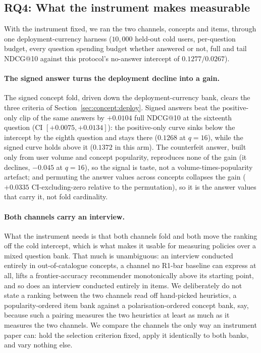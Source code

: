 \documentclass[manuscript,screen]{acmart}
\begin{document}
\subsection{RQ4: What the instrument makes measurable}\label{sec:res:concept}

With the instrument fixed, we ran the two channels, concepts and items, through one deployment-currency harness ($10{,}000$ held-out cold users, per-question budget, every question spending budget whether answered or not, full and tail NDCG@10 against this protocol's no-answer intercept of $0.1277/0.0267$).

\paragraph{The signed answer turns the deployment decline into a gain.} The signed concept fold, driven down the deployment-currency bank, clears the three criteria of Section~\ref{sec:concept:deploy}. Signed answers beat the positive-only clip of the same answers by $+0.0104$ full NDCG@10 at the sixteenth question (CI $[+0.0075,+0.0134]$): the positive-only curve sinks below the intercept by the eighth question and stays there ($0.1268$ at $q{=}16$), while the signed curve holds above it ($0.1372$ in this arm). The counterfeit answer, built only from user volume and concept popularity, reproduces none of the gain (it declines, $-0.045$ at $q{=}16$), so the signal is taste, not a volume-times-popularity artefact; and permuting the answer values across concepts collapses the gain ($+0.0335$ CI-excluding-zero relative to the permutation), so it is the answer values that carry it, not fold cardinality.

\paragraph{Both channels carry an interview.} What the instrument needs is that both channels fold and both move the ranking off the cold intercept, which is what makes it usable for measuring policies over a mixed question bank. That much is unambiguous: an interview conducted entirely in out-of-catalogue concepts, a channel no R1-bar baseline can express at all, lifts a frontier-accuracy recommender monotonically above its starting point, and so does an interview conducted entirely in items. We deliberately do not state a ranking between the two channels read off hand-picked heuristics, a popularity-ordered item bank against a polarisation-ordered concept bank, say, because such a pairing measures the two heuristics at least as much as it measures the two channels. We compare the channels the only way an instrument paper can: hold the selection criterion fixed, apply it identically to both banks, and vary nothing else.
\end{document}
